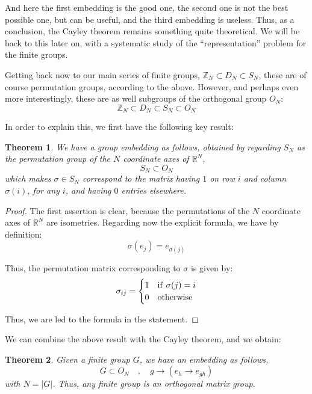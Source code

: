 \documentclass[12pt]{amsbook}
\newtheorem{theorem}{Theorem}[chapter]
\begin{document}
And here the first embedding is the good one, the second one is not the best possible one, but can be useful, and the third embedding is useless. Thus, as a conclusion, the Cayley theorem remains something quite theoretical. We will be back to this later on, with a systematic study of the ``representation'' problem for the finite groups.

\bigskip

Getting back now to our main series of finite groups, $\mathbb Z_N\subset D_N\subset S_N$, these are of course permutation groups, according to the above. However, and perhaps even more interestingly, these are as well subgroups of the orthogonal group $O_N$:
$$\mathbb Z_N\subset D_N\subset S_N\subset O_N$$

In order to explain this, we first have the following key result:


\begin{theorem}
We have a group embedding as follows, obtained by regarding $S_N$ as the permutation group of the $N$ coordinate axes of $\mathbb R^N$,
$$S_N\subset O_N$$
which makes $\sigma\in S_N$ correspond to the matrix having $1$ on row $i$ and column $\sigma(i)$, for any $i$, and having $0$ entries elsewhere.
\end{theorem}

\begin{proof}
The first assertion is clear, because the permutations of the $N$ coordinate axes of $\mathbb R^N$ are isometries. Regarding now the explicit formula, we have by definition:
$$\sigma(e_j)=e_{\sigma(j)}$$

Thus, the permutation matrix corresponding to $\sigma$ is given by:
$$\sigma_{ij}=
\begin{cases}
1&{\rm if}\ \sigma(j)=i\\
0&{\rm otherwise}
\end{cases}$$

Thus, we are led to the formula in the statement.
\end{proof}

We can combine the above result with the Cayley theorem, and we obtain:


\begin{theorem}
Given a finite group $G$, we have an embedding as follows,
$$G\subset O_N\quad,\quad g\to(e_h\to e_{gh})$$
with $N=|G|$. Thus, any finite group is an orthogonal matrix group.
\end{theorem}
\end{document}
